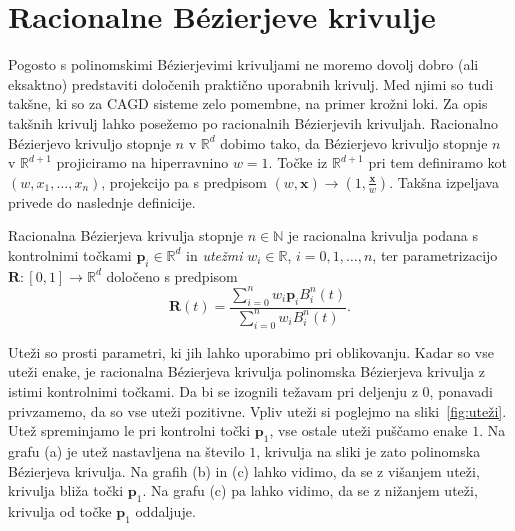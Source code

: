 \documentclass[isrm2, tisk]{fmfdelo}
\newcommand{\R}{\mathbb R}
\newcommand{\N}{\mathbb N}
\newcommand{\p}{\mathbf{p}}
\begin{document}
    \section{Racionalne Bézierjeve krivulje}
    Pogosto s polinomskimi Bézierjevimi krivuljami ne moremo dovolj dobro (ali eksaktno) predstaviti določenih praktično uporabnih krivulj.
    Med njimi so tudi takšne, ki so za CAGD sisteme zelo pomembne, na primer krožni loki.
    Za opis takšnih krivulj lahko posežemo po racionalnih Bézierjevih krivuljah.
    Racionalno Bézierjevo krivuljo stopnje $n$ v $\R^d$ dobimo tako, da Bézierjevo krivuljo stopnje $n$ v $\R^{d+1}$ projiciramo na hiperravnino $w=1$.
    Točke iz $\R^{d+1}$ pri tem definiramo kot $(w,x_1,\ldots,x_n)$, projekcijo pa s predpisom $(w,\mathbf{x})\to(1,\frac{\mathbf{x}}{w})$.
    Takšna izpeljava privede do naslednje definicije.
    \begin{definicija}
        \label{def:racionalna}
        Racionalna Bézierjeva krivulja stopnje $n\in\N$ je racionalna krivulja podana s kontrolnimi točkami $\p_i\in\R^d$ in \textit{utežmi} $w_i\in\R$, $i=0,1,\ldots,n$, ter parametrizacijo $\mathbf{R}:[0,1]\to \R^d$  določeno s predpisom \[\mathbf{R}(t) = \frac{\sum^{n}_{i=0}w_i\p_i B^n_i(t)}{\sum^{n}_{i=0}w_i B^n_i(t)}.\]
    \end{definicija}
    \noindent Uteži so prosti parametri, ki jih lahko uporabimo pri oblikovanju.
    Kadar so vse uteži enake, je racionalna Bézierjeva krivulja polinomska Bézierjeva krivulja z istimi kontrolnimi točkami.
    Da bi se izognili težavam pri deljenju z $0$, ponavadi privzamemo, da so vse uteži pozitivne.
    Vpliv uteži si poglejmo na sliki~\ref{fig:uteži}.
    Utež spreminjamo le pri kontrolni točki $\p_1$, vse ostale uteži puščamo enake $1$.
    Na grafu (a) je utež nastavljena na število $1$, krivulja na sliki je zato polinomska Bézierjeva krivulja.
    Na grafih (b) in (c) lahko vidimo, da se z višanjem uteži, krivulja bliža točki $\p_1$.
    Na grafu (c) pa lahko vidimo, da se z nižanjem uteži, krivulja od točke $\p_1$ oddaljuje.
\end{document}
